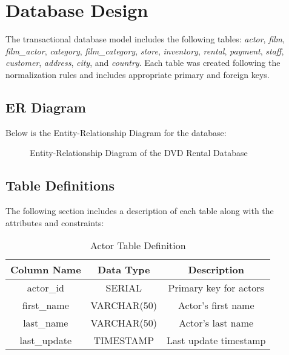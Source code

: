 \documentclass[a4paper, 12pt]{article}
\begin{document}
\section{Database Design}
The transactional database model includes the following tables: \emph{actor}, \emph{film}, \emph{film\_actor}, \emph{category}, \emph{film\_category}, \emph{store}, \emph{inventory}, \emph{rental}, \emph{payment}, \emph{staff}, \emph{customer}, \emph{address}, \emph{city}, and \emph{country}. Each table was created following the normalization rules and includes appropriate primary and foreign keys.

\subsection{ER Diagram}
Below is the Entity-Relationship Diagram for the database:

\begin{figure}[h!]
    \centering
    \caption{Entity-Relationship Diagram of the DVD Rental Database}
\end{figure}

\subsection{Table Definitions}
The following section includes a description of each table along with the attributes and constraints:

\begin{table}[h!]
    \centering
    \begin{tabular}{|c|c|c|}
        \hline
        \textbf{Column Name} & \textbf{Data Type} & \textbf{Description} \\
        \hline
        actor\_id & SERIAL & Primary key for actors \\
        first\_name & VARCHAR(50) & Actor's first name \\
        last\_name & VARCHAR(50) & Actor's last name \\
        last\_update & TIMESTAMP & Last update timestamp \\
        \hline
    \end{tabular}
    \caption{Actor Table Definition}
\end{table}

\end{document}
